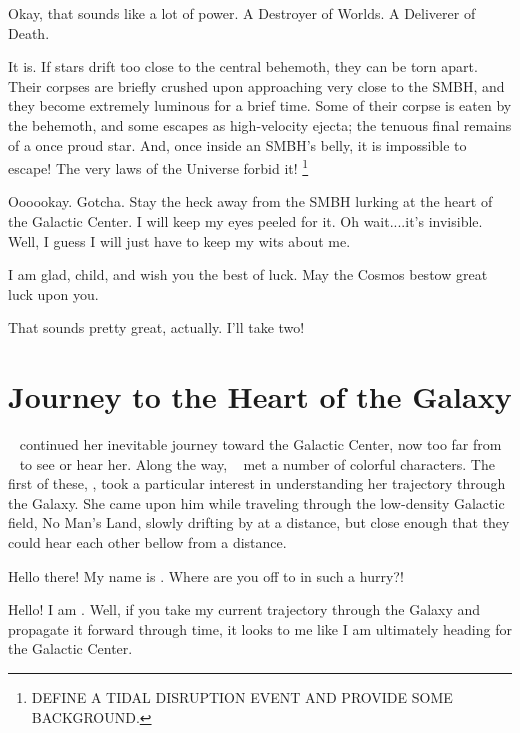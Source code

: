 \documentclass[main.tex]{subfiles}
\begin{document}
\par \Electra Okay, that sounds like a lot of power.  A Destroyer of Worlds.  A Deliverer of Death.  

\par \Aethra It is.  If stars drift too close to the central behemoth, they can be torn apart.  Their corpses are briefly crushed upon approaching very close to the SMBH, and they become extremely luminous for a brief time.  Some of their corpse is eaten by the behemoth, and some escapes as high-velocity ejecta; the tenuous final remains of a once proud star.  And, once inside an SMBH's belly, it is impossible to escape!  The very laws of the Universe forbid it! \footnote{DEFINE A TIDAL DISRUPTION EVENT AND PROVIDE SOME BACKGROUND.}

\par \Electra Oooookay.  Gotcha.  Stay the heck away from the SMBH lurking at the heart of the Galactic Center.  I will keep my eyes peeled for it.  Oh wait....it's invisible.  Well, I guess I will just have to keep my wits about me.

\par \Aethra I am glad, child, and wish you the best of luck.  May the Cosmos bestow great luck upon you.

\par \Electra That sounds pretty great, actually.  I'll take two!

\section{Journey to the Heart of the Galaxy} \label{journey}

\par \nar \rmelectra~ continued her inevitable journey toward the Galactic Center, now too far from \rmaethra~ to see or hear her.  Along the way, \rmelectra~ met a number of colorful characters.  The first of these, \rmdardanus, took a particular interest in understanding her trajectory through the Galaxy.  She came upon him while traveling through the low-density Galactic field, No Man's Land, slowly drifting by at a distance, but close enough that they could hear each other bellow from a distance.

\par \Dardanus Hello there!  My name is \rmdardanus.  Where are you off to in such a hurry?!

\par \Electra  Hello!  I am \rmelectra.  Well, if you take my current trajectory through the Galaxy and propagate it forward through time, it looks to me like I am ultimately heading for the Galactic Center.
\end{document}
